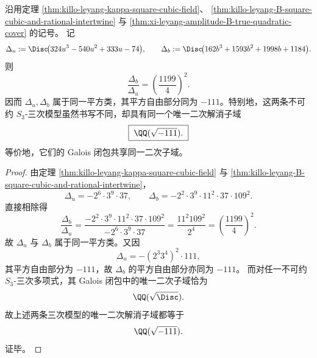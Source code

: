 \begin{corollary}[分支立方域与振幅平方立方域的共同二次解消子域与判别式平方比]\label{cor:xi-leyang-u-b-square-common-quadratic-resolvent}
沿用定理 \ref{thm:killo-leyang-kappa-square-cubic-field}、
\ref{thm:killo-leyang-B-square-cubic-and-rational-intertwine} 与
\ref{thm:xi-leyang-amplitude-B-true-quadratic-cover} 的记号。
记
\[
\Delta_u:=\Disc\!\bigl(324u^3-540u^2+333u-74\bigr),
\qquad
\Delta_b:=\Disc\!\bigl(162b^3+1593b^2+1998b+1184\bigr).
\]
则
\[
\frac{\Delta_b}{\Delta_u}
=
\left(\frac{1199}{4}\right)^2.
\]
因而 \(\Delta_u,\Delta_b\) 属于同一平方类，其平方自由部分同为
\(-111\)。特别地，这两条不可约 \(S_3\)-三次模型虽然书写不同，却具有同一个唯一二次解消子域
\[
\boxed{\;
\QQ(\sqrt{-111}).\;}
\]
等价地，它们的 Galois 闭包共享同一二次子域。
\end{corollary}
\begin{proof}
由定理 \ref{thm:killo-leyang-kappa-square-cubic-field} 与
\ref{thm:killo-leyang-B-square-cubic-and-rational-intertwine}，
\[
\Delta_u=-2^{6}\cdot 3^{9}\cdot 37,
\qquad
\Delta_b=-2^{2}\cdot 3^{9}\cdot 11^{2}\cdot 37\cdot 109^{2}.
\]
直接相除得
\[
\frac{\Delta_b}{\Delta_u}
=
\frac{-2^{2}\cdot 3^{9}\cdot 11^{2}\cdot 37\cdot 109^{2}}
{-2^{6}\cdot 3^{9}\cdot 37}
=
\frac{11^{2}109^{2}}{2^{4}}
=
\left(\frac{1199}{4}\right)^2.
\]
故 \(\Delta_u\) 与 \(\Delta_b\) 属于同一平方类。又因
\[
\Delta_u=-(2^3 3^4)^2\cdot 111,
\]
其平方自由部分为 \(-111\)，故 \(\Delta_b\) 的平方自由部分亦同为 \(-111\)。
而对任一不可约 \(S_3\)-三次多项式，其 Galois 闭包中的唯一二次子域恰为
\[
\QQ(\sqrt{\Disc}).
\]
故上述两条三次模型的唯一二次解消子域都等于
\[
\QQ(\sqrt{-111}).
\]
证毕。
\end{proof}



